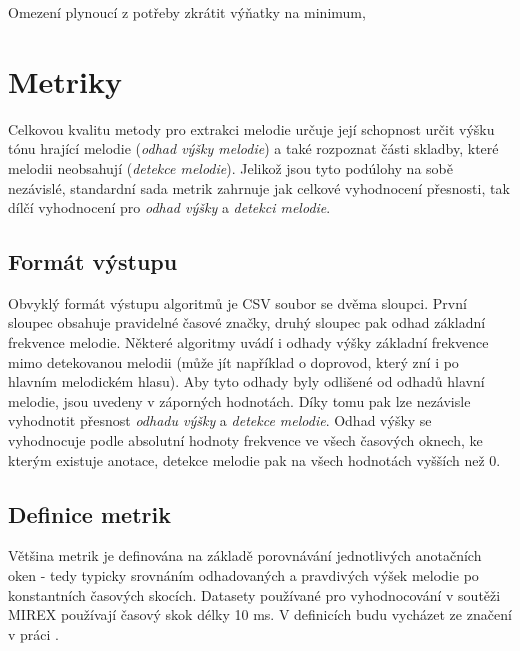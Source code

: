 Omezení plynoucí z potřeby zkrátit výňatky na minimum,


\section{Metriky}

Celkovou kvalitu metody pro extrakci melodie určuje její schopnost určit výšku tónu hrající melodie (\textit{odhad výšky melodie}) a také rozpoznat části skladby, které melodii neobsahují (\textit{detekce melodie}). Jelikož jsou tyto podúlohy na sobě nezávislé, standardní sada metrik zahrnuje jak celkové vyhodnocení přesnosti, tak dílčí vyhodnocení pro \textit{odhad výšky} a \textit{detekci melodie}. 



\subsection{Formát výstupu}

Obvyklý formát výstupu algoritmů je CSV soubor se dvěma sloupci. První sloupec obsahuje pravidelné časové značky, druhý sloupec pak odhad základní frekvence melodie. Některé algoritmy uvádí i odhady výšky základní frekvence mimo detekovanou melodii (může jít například o doprovod, který zní i po hlavním melodickém hlasu). Aby tyto odhady byly odlišené od odhadů hlavní melodie, jsou uvedeny v záporných hodnotách. Díky tomu pak lze nezávisle vyhodnotit přesnost \textit{odhadu výšky} a \textit{detekce melodie}. Odhad výšky se vyhodnocuje podle absolutní hodnoty frekvence ve všech časových oknech, ke kterým existuje anotace, detekce melodie pak na všech hodnotách vyšších než 0. 

\subsection{Definice metrik}

Většina metrik je definována na základě porovnávání jednotlivých anotačních oken - tedy typicky srovnáním odhadovaných a pravdivých výšek melodie po konstantních časových skocích. Datasety používané pro vyhodnocování v soutěži MIREX používají časový skok délky 10 ms. V definicích budu vycházet ze značení v práci \cite{Salamon2014}. 

